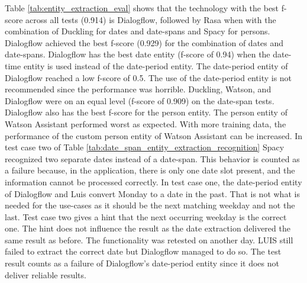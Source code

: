 Table \ref{tab:entity_extraction_eval} shows that the technology with the best f-score across all tests (0.914) is Dialogflow, followed by Rasa when with the combination of Duckling for dates and date-spans and Spacy for persons.
Dialogflow achieved the best f-score (0.929) for the combination of dates and date-spans.
Dialogflow has the best date entity (f-score of 0.94) when the date-time entity is used instead of the date-period entity.
The date-period entity of Dialogflow reached a low f-score of 0.5.
The use of the date-period entity is not recommended since the performance was horrible.
Duckling, Watson, and Dialogflow were on an equal level (f-score of 0.909) on the date-span tests.
Dialogflow also has the best f-score for the person entity.
The person entity of Watson Assistant performed worst as expected.
With more training data, the performance of the custom person entity of Watson Assistant can be increased.
In test case two of Table \ref{tab:date_span_entity_extraction_recognition} Spacy recognized two separate dates instead of a date-span.
This behavior is counted as a failure because, in the application, there is only one date slot present, and the information cannot be processed correctly.
In test case one, the date-period entity of Dialogflow and Luis convert Monday to a date in the past.
That is not what is needed for the use-cases as it should be the next matching weekday and not the last.
Test case two gives a hint that the next occurring weekday is the correct one.
The hint does not influence the result as the date extraction delivered the same result as before.
The functionality was retested on another day.
LUIS still failed to extract the correct date but Dialogflow 
managed to do so.
The test result counts as a failure of Dialogflow's date-period entity since it does not deliver reliable results.

